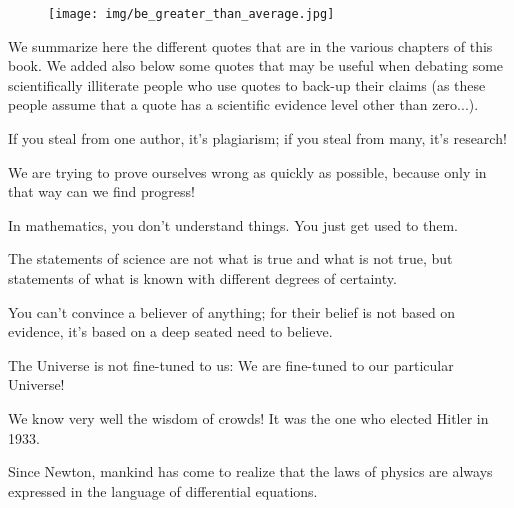 	\begin{figure}[H]
		\centering
		\texttt{[image: img/be\_greater\_than\_average.jpg]}	
	\end{figure} 	
	We summarize here the different quotes that are in the various chapters of this book. We added also below some quotes that may be useful when debating some scientifically illiterate people who use quotes to back-up their claims (as these people assume that a quote has a scientific evidence level other than zero...).
	
	\begin{fquote}If you steal from one author, it's plagiarism; if you steal from many, it's research!
 	\end{fquote}
	
	\begin{fquote}We are trying to prove ourselves wrong as quickly as possible, because only in that way can we find progress!
 	\end{fquote}
 	
 	\begin{fquote}In mathematics, you don't understand things. You just get used to them.
 	\end{fquote}
 	
 	\begin{fquote}The statements of science are not what is true and what is not true, but statements of what is known with different degrees of certainty.
 	\end{fquote}
 	
 	\begin{fquote}You can't convince a believer of anything; for their belief is not based on evidence, it's based on a deep seated need to believe.
 	\end{fquote}
 	
 	\begin{fquote}The Universe is not fine-tuned to us: We are fine-tuned to our particular Universe!
 	\end{fquote}
 	
 	\begin{fquote}We know very well the wisdom of crowds! It was the one who elected Hitler in 1933.
 	\end{fquote}
 	
 	\begin{fquote}Since Newton, mankind has come to realize that the laws of physics are always expressed in the language of differential equations.
 	\end{fquote}
 	
